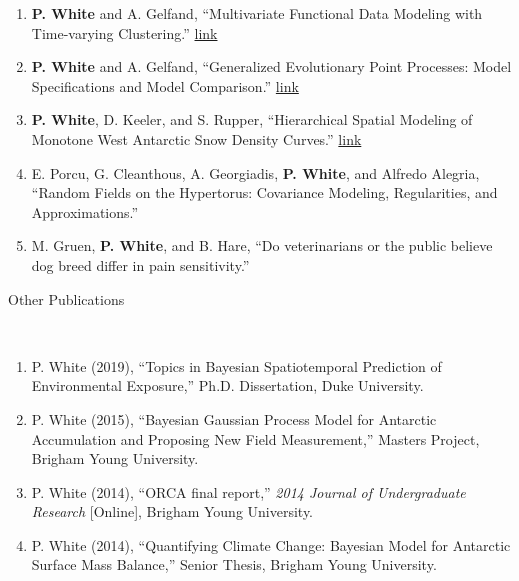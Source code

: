 \documentclass[11pt]{article}
\newcommand{\head}[1]{ %
    \bigskip %
    \begin{large}\begin{bf}{#1}\end{bf}\end{large} %

    \ \\ [-1.3cm] %

    \hrulefill}
\begin{document}
\begin{enumerate}[label=$\bullet$]
\item \textbf{P. White} and A. Gelfand, ``Multivariate Functional Data Modeling with Time-varying Clustering.'' \href{https://arxiv.org/abs/1904.11518}{link}
\item \textbf{P. White} and A. Gelfand, ``Generalized Evolutionary Point Processes: Model Specifications and Model Comparison.''  \href{https://arxiv.org/abs/1910.06897}{link}
\item \textbf{P. White}, D. Keeler, and S. Rupper, ``Hierarchical Spatial Modeling of Monotone West Antarctic Snow Density Curves.'' \href{https://arxiv.org/abs/2001.05520}{link}
\item E. Porcu, G. Cleanthous, A. Georgiadis, \textbf{P. White}, and  Alfredo Alegria, ``Random Fields on the Hypertorus: Covariance Modeling, Regularities, and Approximations.'' 
\item M. Gruen, \textbf{P. White}, and B. Hare, ``Do veterinarians or the public believe dog breed differ in pain sensitivity.''
\end{enumerate}


%


\head{Other Publications}

\begin{enumerate}[label=$\bullet$]
\item P. White (2019), ``Topics in Bayesian Spatiotemporal Prediction of Environmental Exposure,'' Ph.D. Dissertation, Duke University.
\item P. White (2015), ``Bayesian Gaussian Process Model for Antarctic Accumulation and Proposing New Field Measurement,'' Masters Project, Brigham Young University.
\item P. White (2014), ``ORCA final report,'' \emph{2014 Journal of Undergraduate Research} [Online], Brigham Young University.
\item P. White (2014), ``Quantifying Climate Change: Bayesian Model for Antarctic Surface Mass Balance,'' Senior Thesis, Brigham Young University.
\end{enumerate}
\end{document}
